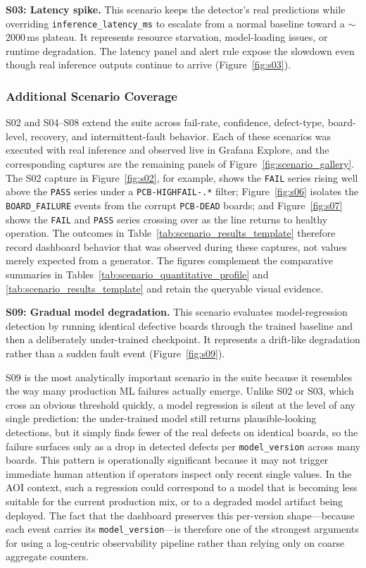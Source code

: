 \documentclass[12pt,a4paper]{article}
\begin{document}
\textbf{S03: Latency spike.}
This scenario keeps the detector's real predictions while overriding
\texttt{inference\_latency\_ms} to escalate from a normal baseline toward a
$\sim$2000\,ms plateau. It represents resource starvation, model-loading issues,
or runtime degradation. The latency panel and alert rule expose the slowdown even
though real inference outputs continue to arrive (Figure~\ref{fig:s03}).

\FloatBarrier
\subsubsection{Additional Scenario Coverage}
S02 and S04--S08 extend the suite across fail-rate, confidence, defect-type,
board-level, recovery, and intermittent-fault behavior. Each of these scenarios
was executed with real inference and observed live in Grafana Explore, and the
corresponding captures are the remaining panels of Figure~\ref{fig:scenario_gallery}. The
S02 capture in Figure~\ref{fig:s02}, for example, shows the \texttt{FAIL} series
rising well above the \texttt{PASS} series under a \texttt{PCB-HIGHFAIL-.*} filter;
Figure~\ref{fig:s06} isolates the \texttt{BOARD\_FAILURE} events from the corrupt
\texttt{PCB-DEAD} boards; and Figure~\ref{fig:s07} shows the \texttt{FAIL} and
\texttt{PASS} series crossing over as the line returns to healthy operation. The
outcomes in Table~\ref{tab:scenario_results_template} therefore record dashboard
behavior that was observed during these captures, not values merely expected from
a generator. The figures complement the comparative summaries in
Tables~\ref{tab:scenario_quantitative_profile} and
\ref{tab:scenario_results_template} and retain the queryable visual evidence.

\textbf{S09: Gradual model degradation.}
This scenario evaluates model-regression detection by running identical defective
boards through the trained baseline and then a deliberately under-trained
checkpoint. It represents a drift-like degradation rather than a sudden fault
event (Figure~\ref{fig:s09}).

S09 is the most analytically important scenario in the suite because it
resembles the way many production ML failures actually emerge. Unlike S02 or
S03, which cross an obvious threshold quickly, a model regression is silent at
the level of any single prediction: the under-trained model still returns
plausible-looking detections, but it simply finds fewer of the real defects on
identical boards, so the failure surfaces only as a drop in detected defects per
\texttt{model\_version} across many boards. This pattern is operationally
significant because it may not trigger immediate human attention if operators
inspect only recent single values. In the AOI context, such a regression could
correspond to a model that is becoming less suitable for the current production
mix, or to a degraded model artifact being deployed. The fact that the dashboard
preserves this per-version shape---because each event carries its
\texttt{model\_version}---is therefore one of the strongest arguments for using a
log-centric observability pipeline rather than relying only on coarse aggregate
counters.
\end{document}
